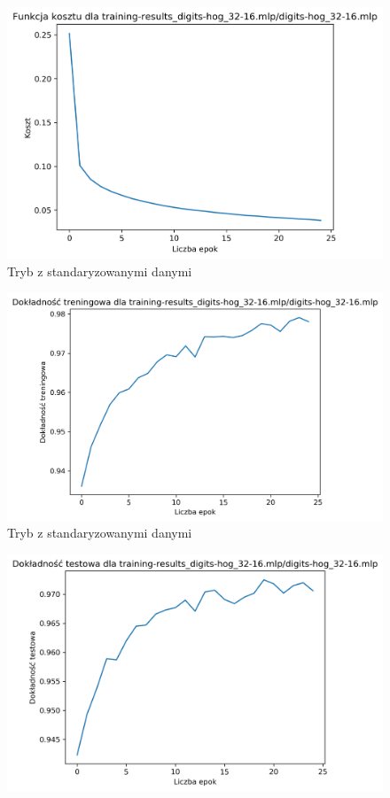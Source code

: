 \documentclass{classrep}
\begin{document}
{{{\begin{figure}[!htbp]
                    \includegraphics[width=155mm]{wykresy/digits-hog_32-16_mlp_cost.png}
                    \caption{Tryb z standaryzowanymi danymi}
                \end{figure}
                \begin{figure}[!htbp]
                    \centering
                    \includegraphics[width=155mm]{wykresy/digits-hog_32-16_mlp_training-accuracy.png}
                    \caption{Tryb z standaryzowanymi danymi}
                \end{figure}
                \begin{figure}[!htbp]
                    \centering
                    \includegraphics[width=155mm]{wykresy/digits-hog_32-16_mlp_testing-accuracy.png}

\end{figure}}}}
\end{document}
